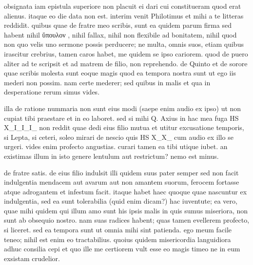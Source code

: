 


 obsignata iam epistula superiore non placuit ei dari cui constitueram quod erat alienus. itaque eo die data non est. interim venit Philotimus et mihi a te litteras reddidit. quibus quae de fratre meo scribis, sunt ea quidem parum firma sed habent nihil ὕπουλον , nihil fallax, nihil non flexibile ad bonitatem, nihil quod non quo velis uno sermone possis perducere; ne multa, omnis suos, etiam quibus irascitur crebrius, tamen caros habet, me quidem se ipso cariorem. quod de puero aliter ad te scripsit et ad matrem de filio, non reprehendo. de Quinto et de sorore quae scribis molesta sunt eoque magis quod ea tempora nostra sunt ut ego iis mederi non possim. nam certe mederer; sed quibus in malis et qua in desperatione rerum simus vides.

 illa de ratione nummaria non sunt eius modi (saepe enim audio ex ipso) ut non cupiat tibi praestare et in eo laboret. sed si mihi Q. Axius in hac mea fuga HS X_I_I_I_ non reddit quae dedi eius filio mutua et utitur excusatione temporis, si Lepta, si ceteri, soleo mirari de nescio quis HS X_X_ cum audio ex illo se urgeri. vides enim profecto angustias. curari tamen ea tibi utique iubet. an existimas illum in isto genere lentulum aut restrictum? nemo est minus.

 de fratre satis. de eius filio indulsit illi quidem suus pater semper sed non facit indulgentia mendacem aut avarum aut non amantem suorum, ferocem fortasse atque adrogantem et infestum facit. itaque habet haec quoque quae nascuntur ex indulgentia, sed ea sunt tolerabilia (quid enim dicam?) hac iuventute; ea vero, quae mihi quidem qui illum amo sunt his ipsis malis in quis sumus miseriora, non sunt ab obsequio nostro. nam suas radices habent; quas tamen evellerem profecto, si liceret. sed ea tempora sunt ut omnia mihi sint patienda. ego meum facile teneo; nihil est enim eo tractabilius. quoius quidem misericordia languidiora adhuc consilia cepi et quo ille me certiorem vult esse eo magis timeo ne in eum exsistam crudelior.

